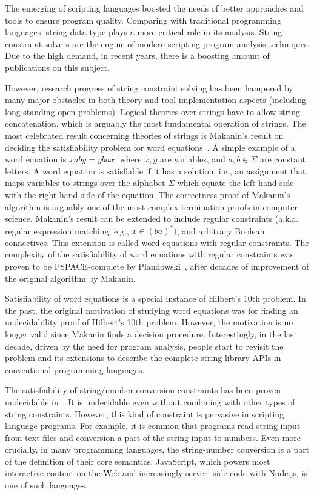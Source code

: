 The emerging of scripting languages boosted the needs of better approaches and tools to ensure program quality.
Comparing with traditional programming languages, string data type plays a more critical role in its analysis.
String constraint solvers are the engine of modern scripting program analysis techniques. 
Due to the high demand, in recent years, there is a boosting amount of publications on this subject.

However, research progress of string constraint solving has been hampered by many major obstacles in both theory and tool implementation aspects (including long-standing open problems). 
Logical theories over strings have to allow string concatenation, which is arguably the most fundamental operation of strings. 
The most celebrated result concerning theories of strings is Makanin’s result on deciding the satisfiability problem for word equations~\cite{}.
A simple example of a word equation is $xaby = ybax$, where $x, y$ are variables, and $a, b \in \Sigma$ are constant letters. 
A word equation is satisfiable if it has a solution, i.e., an assignment that maps variables to strings over the alphabet $\Sigma$ which equate the left-hand side with the right-hand side of the equation.
The correctness proof of Makanin’s algorithm is arguably one of the most complex termination proofs in computer science. 
Makanin’s result can be extended to include regular constraints (a.k.a. regular expression matching, e.g., $x \in (ba)^*)$, and arbitrary Boolean connectives.
This extension is called word equations with regular constraints. 
The complexity of the satisfiability of word equations with regular constraints was proven to be PSPACE-complete by Plandowski~\cite{}, after decades of improvement of the original algorithm by Makanin.

Satisfiability of word equations is a special instance of Hilbert’s 10th problem. 
In the past, the original motivation of studying word equations was for finding an undecidability proof of Hilbert’s 10th problem. 
However, the motivation is no longer valid since Makanin finds a decision procedure. Interestingly, in the last decade, driven by the need for program analysis, people start to revisit the problem and its extensions to describe the complete string library APIs in conventional programming languages.

The satisfiability of string/number conversion constraints has been proven undecidable in~\cite{}. 
It is undecidable even without combining with other types of string constraints.
However, this kind of constraint is pervasive in scripting language programs. 
For example, it is common that programs read string input from text files and conversion a part of the string input to numbers.
Even more crucially, in many programming languages, the string-number conversion is a part of the definition of their core semantics. 
JavaScript, which powers most interactive content on the Web and increasingly server- side code with Node.js, is one of such languages. 


